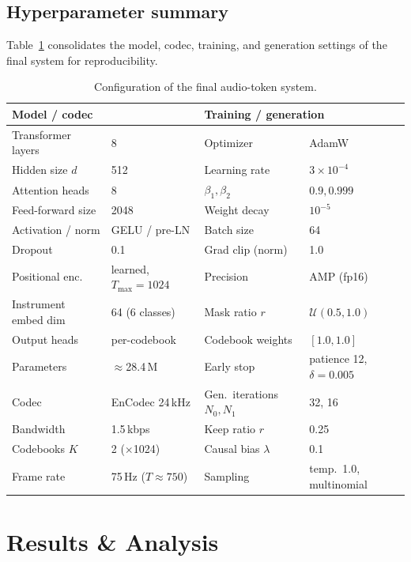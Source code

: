 \documentclass{article}
\begin{document}
\subsection{Hyperparameter summary}

Table~\ref{tab:hparams} consolidates the model, codec, training, and generation settings of the final system for reproducibility.

\begin{table}[t]
\centering
\caption{Configuration of the final audio-token system.}
\label{tab:hparams}
\small
\begin{tabular}{llll}
\toprule
\multicolumn{2}{l}{\textbf{Model / codec}} & \multicolumn{2}{l}{\textbf{Training / generation}} \\
\midrule
Transformer layers & 8 & Optimizer & AdamW \\
Hidden size $d$ & 512 & Learning rate & $3\times10^{-4}$ \\
Attention heads & 8 & $\beta_1,\beta_2$ & $0.9, 0.999$ \\
Feed-forward size & 2048 & Weight decay & $10^{-5}$ \\
Activation / norm & GELU / pre-LN & Batch size & 64 \\
Dropout & 0.1 & Grad clip (norm) & 1.0 \\
Positional enc. & learned, $T_{\max}{=}1024$ & Precision & AMP (fp16) \\
Instrument embed dim & 64 ($6$ classes) & Mask ratio $r$ & $\mathcal{U}(0.5,1.0)$ \\
Output heads & per-codebook & Codebook weights & $[1.0, 1.0]$ \\
Parameters & $\approx$28.4\,M & Early stop & patience 12, $\delta{=}0.005$ \\
\midrule
Codec & EnCodec 24\,kHz & Gen.\ iterations $N_0,N_1$ & 32, 16 \\
Bandwidth & 1.5\,kbps & Keep ratio $r$ & 0.25 \\
Codebooks $K$ & 2 ($\times$1024) & Causal bias $\lambda$ & 0.1 \\
Frame rate & 75\,Hz ($T{\approx}750$) & Sampling & temp.\ 1.0, multinomial \\
\bottomrule
\end{tabular}
\end{table}

\section{Results \& Analysis}
\end{document}
